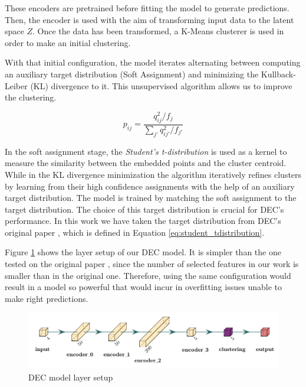 \documentclass[11pt,a4paper,english,twocolumn]{article}
\begin{document}
These encoders are pretrained before fitting the model to generate predictions. Then,
the encoder is used with the aim of transforming input data to the latent space $Z$. Once the
data has been transformed, a K-Means clusterer is used in order to make an initial clustering.

With that initial configuration, the model iterates alternating between computing an auxiliary
target distribution (Soft Assignment) and minimizing the Kullback-Leiber (KL) divergence
\cite{kullback1951information} to it. This unsupervised algorithm allows us to improve the clustering.

\begin{equation}
  p_{ij} = \frac{q^{2}_{ij} / f_{j}}{\sum_{j'}q^{2}_{ij'}/f_{j'}}
  \label{eq:student_tdistribution}
\end{equation}

In the soft assignment stage,
the \emph{Student's t-distribution} is used as a kernel to measure the similarity
between the embedded points and the cluster centroid.
While in the KL divergence minimization the algorithm iteratively refines clusters by learning
from their high confidence assignments with the help of an auxiliary target distribution.
The model is trained by matching the soft assignment to the target distribution.
The choice of this target distribution is crucial for DEC's performance.
In this work we have taken the target distribution from DEC's original paper \cite{xie2016unsupervised},
which is defined in Equation \ref{eq:student_tdistribution}.

Figure \ref{fig:dec_model_setup} shows the layer setup of our DEC model.
It is simpler than the one tested on the original paper \cite{xie2016unsupervised},
since the number of selected features in our work is smaller than in the original one.
Therefore, using the same configuration would result in a model so
powerful that would incur in overfitting issues unable to make right predictions.

\begin{figure}
  \includegraphics[width=\columnwidth]{../figures/dec_diagram.pdf}
  \caption{DEC model layer setup}
  \label{fig:dec_model_setup}
\end{figure}
\end{document}
